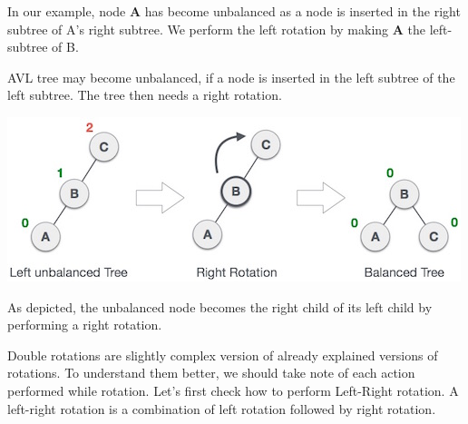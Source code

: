 In our example, node \textbf{A} has become unbalanced as a node is inserted in the right subtree of A's right subtree. We perform the left rotation by making \textbf{A} the left-subtree of B.

\hypertarget{right-rotation}{%
\label{right-rotation}}

AVL tree may become unbalanced, if a node is inserted in the left subtree of the left subtree. The tree then needs a right rotation.

\begin{center}
\includegraphics[scale=.60]{images/avl_right_rotation.jpg}
\end{center}

As depicted, the unbalanced node becomes the right child of its left child by performing a right rotation.

\hypertarget{left-right-rotation}{%
\label{left-right-rotation}}

Double rotations are slightly complex version of already explained versions of rotations. To understand them better, we should take note of each action performed while rotation. Let's first check how to perform Left-Right rotation. A left-right rotation is a combination of left rotation followed by right rotation.

